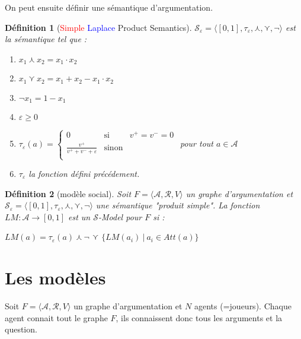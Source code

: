 \documentclass[12pt]{article}
\theoremstyle{defi}
\newtheorem{definition}{Définition}[section]
\theoremstyle{not}
\theoremstyle{prob}
\begin{document}
  \color{black}
    On peut ensuite définir une sémantique d'argumentation.
    \begin{definition}[\textcolor{red}{Simple} \textcolor{blue}{Laplace} Product Semantics]
      $\mathcal{S}_\varepsilon = \langle [0, 1], \tau_\varepsilon, \curlywedge, \curlyvee, \neg  \rangle$ est la sémantique tel que :
      \begin{enumerate}
        \item $x_1 \curlywedge x_2 = x_1 \cdot x_2$
        \item $x_1 \curlyvee x_2 = x_1 + x_2 - x_1 \cdot x_2$
        \item $\neg x_1 = 1 - x_1$
\color{red}
        \item $\varepsilon \geq 0$
        \item $\tau_\varepsilon(a) = \left\{
          \begin{array}{lll}
            0 & \mbox{si } & v^+ = v^- = 0\\
            \frac{v^+}{v^+ + v^- + \varepsilon} & \mbox{sinon} & \\
          \end{array}\right.$ pour tout $a \in \mathcal{A}$
\color{blue}
        \item $\tau_\varepsilon$ la fonction défini précédement.
\color{black}
      \end{enumerate}

    \end{definition}

\begin{definition}[modèle social]
  Soit $F= \langle \mathcal{A}, \mathcal{R}, V \rangle$ un graphe d'argumentation et $\mathcal{S}_\varepsilon = \langle [0, 1], \tau_\varepsilon, \curlywedge, \curlyvee, \neg  \rangle$ une sémantique "produit simple".
  La fonction $LM : \mathcal{A} \rightarrow [0, 1]$ est un $\mathcal{S}$-Model pour $F$ si :

  $LM(a) = \tau_\varepsilon(a) \curlywedge \neg$ {\Large $\curlyvee$} $\{LM(a_i)\ |\ a_i \in Att(a)\}$
\end{definition}

\section{Les modèles}
  Soit $F = \langle \mathcal{A}, \mathcal{R}, V \rangle$ un graphe d'argumentation et $N$ agents (=joueurs). Chaque agent connait tout le graphe $F$, ils connaissent donc tous les arguments et la question.
\end{document}
